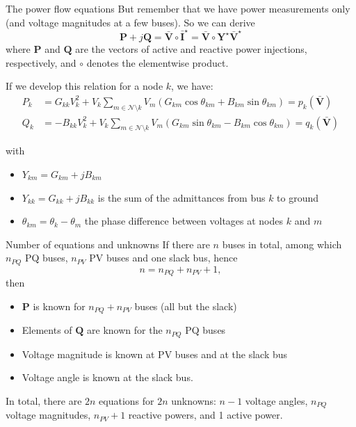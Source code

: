 \begin{frame}[allowframebreaks]{The power flow equations}
    But remember that we have power measurements only (and voltage magnitudes at a few buses). So we can derive
    \begin{equation}
        \mathbf{P} +j \mathbf{Q} = \mathbf{\bar{V}} \circ \mathbf{\bar{I}}^{\star}
        = \mathbf{\bar{V}} \circ \mathbf{Y}^{\star} \mathbf{\bar{V}}^{\star} \label{eq:pf}
    \end{equation}
    where $\mathbf{P}$ and $\mathbf{Q}$ are the vectors of active and reactive power injections, respectively, and $\circ$ denotes the elementwise product.
    
    If we develop this relation for a node $k$, we have:
    \begin{align*}
        P_k &= G_{kk} V_k^2  + V_k \sum_{m \in \mathcal{N} \setminus k} V_m(G_{km} \cos\theta_{km} + B_{km} \sin\theta_{km}) = p_k(\mathbf{\bar{V}}) \\
        Q_k &= -B_{kk} V_k^2 + V_k \sum_{m \in \mathcal{N} \setminus k} V_m(G_{km} \sin\theta_{km} - B_{km} \cos\theta_{km}) = q_k(\mathbf{\bar{V}})
    \end{align*}
   
    with
    \begin{itemize}
        \item $Y_{km} = G_{km} + j B_{km}$
        \item $Y_{kk} = G_{kk} + j B_{kk}$ is the sum of the admittances from bus $k$ to ground
        \item $\theta_{km} = \theta_{k} - \theta_{m}$ the phase difference between voltages at nodes $k$ and $m$
    \end{itemize}
\end{frame}

\begin{frame}[allowframebreaks]{Number of equations and unknowns}
    If there are $n$ buses in total, among which $n_{PQ}$ PQ buses, $n_{PV}$ PV buses and one slack bus, hence
    $$ n = n_{PQ} + n_{PV} + 1,$$
    then
    \begin{itemize}
        \item $\mathbf{P}$ is known for $n_{PQ} + n_{PV}$ buses (all but the slack)
        \item Elements of $\mathbf{Q}$ are known for the $n_{PQ}$ PQ buses
        \item Voltage magnitude is known at PV buses and at the slack bus
        \item Voltage angle is known at the slack bus.
    \end{itemize}
    
    \vspace{1cm}
    
    In total, there are $2n$ equations for $2n$ unknowns: $n-1$ voltage angles, $n_{PQ}$ voltage magnitudes, $n_{PV} + 1$ reactive powers, and 1 active power.
\end{frame}

